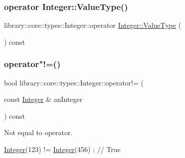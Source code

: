 \mbox{\label{classlibrary_1_1core_1_1types_1_1_integer_ad1cf430796727e18440d50d4764b2792}} 
\subsubsection{\texorpdfstring{operator Integer\+::\+Value\+Type()}{operator Integer::ValueType()}}
{\footnotesize\ttfamily library\+::core\+::types\+::\+Integer\+::operator \hyperlink{classlibrary_1_1core_1_1types_1_1_integer_a623afb1580f870fd8a1997b1c12c917d}{Integer\+::\+Value\+Type} (\begin{DoxyParamCaption}{ }\end{DoxyParamCaption}) const}

\mbox{\label{classlibrary_1_1core_1_1types_1_1_integer_a9145ffb6bca8771f06a3403056466d53}} 
\subsubsection{\texorpdfstring{operator"!=()}{operator!=()}\hspace{0.1cm}{\footnotesize\ttfamily [1/2]}}
{\footnotesize\ttfamily bool library\+::core\+::types\+::\+Integer\+::operator!= (\begin{DoxyParamCaption}\item[{const \hyperlink{classlibrary_1_1core_1_1types_1_1_integer}{Integer} \&}]{an\+Integer }\end{DoxyParamCaption}) const}



Not equal to operator. 


\begin{DoxyCode}
\hyperlink{classlibrary_1_1core_1_1types_1_1_integer_a6483b1c4e13e5ed6af5e7a58347efead}{Integer}(123) != \hyperlink{classlibrary_1_1core_1_1types_1_1_integer_a6483b1c4e13e5ed6af5e7a58347efead}{Integer}(456) ; \textcolor{comment}{// True}
\end{DoxyCode}




